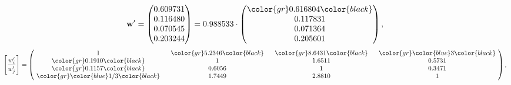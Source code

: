 \begin{example}
\begin{equation*}
\mathbf{w}^{\prime} =
\begin{pmatrix}
0.609731\\
0.116480\\
0.070545\\
0.203244
\end{pmatrix} =
0.988533\cdot
\begin{pmatrix}
\color{gr} 0.616804\color{black} \\
0.117831\\
0.071364\\
0.205601
\end{pmatrix},
\end{equation*}
\begin{equation*}
\left[ \frac{{w}^{\prime}_i}{{w}^{\prime}_j} \right] =
\begin{pmatrix}
$\,\,$ 1 $\,\,$ & $\,\,$\color{gr} 5.2346\color{black} $\,\,$ & $\,\,$\color{gr} 8.6431\color{black} $\,\,$ & $\,\,$\color{gr} \color{blue} 3\color{black} $\,\,$ \\
$\,\,$\color{gr} 0.1910\color{black} $\,\,$ & $\,\,$ 1 $\,\,$ & $\,\,$1.6511$\,\,$ & $\,\,$0.5731  $\,\,$ \\
$\,\,$\color{gr} 0.1157\color{black} $\,\,$ & $\,\,$0.6056$\,\,$ & $\,\,$ 1 $\,\,$ & $\,\,$0.3471 $\,\,$ \\
$\,\,$\color{gr} \color{blue}  1/3\color{black} $\,\,$ & $\,\,$1.7449$\,\,$ & $\,\,$2.8810$\,\,$ & $\,\,$ 1  $\,\,$ \\
\end{pmatrix},
\end{equation*}
\end{example}
\newpage
